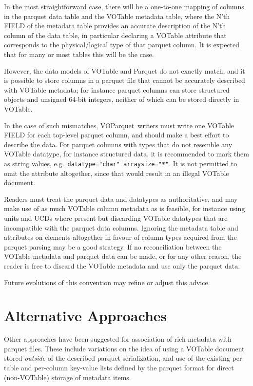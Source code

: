 \documentclass[11pt,a4paper]{ivoa}
\newcommand{\voparquet}{VOParquet}
\begin{document}
In the most straightforward case, there will be a one-to-one mapping
of columns in the parquet data table and the VOTable metadata table,
where the N'th FIELD of the metadata table provides an accurate
description of the N'th column of the data table,
in particular declaring a VOTable  attribute that
corresponds to the physical/logical type of that parquet column.
It is expected that for many or most tables this will be the case.

However, the data models of VOTable and Parquet do not exactly match,
and it is possible to store columns in a parquet file that cannot be
accurately described with VOTable metadata;
for instance parquet columns can store structured objects and
unsigned 64-bit integers, neither of which can be stored directly
in VOTable.

In the case of such mismatches,
\voparquet\ writers must write one VOTable FIELD
for each top-level parquet column,
and should make a best effort to describe the data.
For parquet columns with types that do not resemble any VOTable datatype,
for instance structured data, it is recommended to mark them as
string values, e.g.\ \verb|datatype="char" arraysize="*"|.
It is not permitted to omit the  attribute altogether,
since that would result in an illegal VOTable document.

Readers must treat the parquet data and datatypes as authoritative,
and may make use of as much VOTable column metadata as is feasible,
for instance using units and UCDs where present but discarding
VOTable datatypes that are incompatible with the parquet data columns.
Ignoring the metadata table  and  attributes
on  elements altogether in favour of column types acquired
from the parquet parsing may be a good strategy.
If no reconciliation between the VOTable metadata and
parquet data can be made, or for any other reason,
the reader is free to discard the VOTable metadata and use only
the parquet data.

Future evolutions of this convention may refine or adjust this advice.

\section{Alternative Approaches}

Other approaches have been suggested for association of rich metadata
with parquet files.
These include variations on the idea of
using a VOTable document stored {\em outside\/} of the described parquet
serialization,
and use of the existing per-table and per-column key-value lists
defined by the parquet format for direct (non-VOTable) storage
of metadata items.
\end{document}
